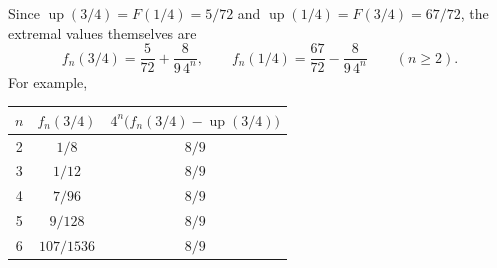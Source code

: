 \documentclass[11pt,oneside]{article}
\theoremstyle{definition}
\theoremstyle{remark}
\newcommand{\Up}{\operatorname{up}}
\begin{document}
Since $\Up(3/4)=F(1/4)=5/72$ and $\Up(1/4)=F(3/4)=67/72$, the extremal values themselves are
\begin{equation}
 f_n(3/4)=\frac5{72}+\frac8{9\,4^n},
 \qquad
 f_n(1/4)=\frac{67}{72}-\frac8{9\,4^n}
 \qquad(n\ge2).                                            \label{repeated:eq:extremal-values}
\end{equation}
For example,
\begin{center}
\begin{tabular}{c@{\qquad}c@{\qquad}c}
\toprule
$n$ & $f_n(3/4)$ & $4^n\bigl(f_n(3/4)-\Up(3/4)\bigr)$\\
\midrule
2 & $1/8$ & $8/9$\\
3 & $1/12$ & $8/9$\\
4 & $7/96$ & $8/9$\\
5 & $9/128$ & $8/9$\\
6 & $107/1536$ & $8/9$\\
\bottomrule
\end{tabular}
\end{center}
\end{document}

